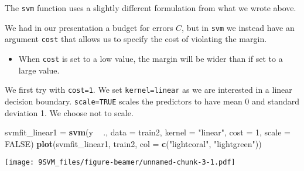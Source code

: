 \documentclass[10pt,ignorenonframetext,]{beamer}
\newenvironment{Shaded}{\begin{snugshade}}{\end{snugshade}}
\newcommand{\KeywordTok}[1]{\textcolor[rgb]{0.13,0.29,0.53}{\textbf{#1}}}
\newcommand{\DataTypeTok}[1]{\textcolor[rgb]{0.13,0.29,0.53}{#1}}
\newcommand{\DecValTok}[1]{\textcolor[rgb]{0.00,0.00,0.81}{#1}}
\newcommand{\StringTok}[1]{\textcolor[rgb]{0.31,0.60,0.02}{#1}}
\newcommand{\OtherTok}[1]{\textcolor[rgb]{0.56,0.35,0.01}{#1}}
\newcommand{\OperatorTok}[1]{\textcolor[rgb]{0.81,0.36,0.00}{\textbf{#1}}}
\newcommand{\NormalTok}[1]{#1}
\providecommand{\tightlist}{%
  \setlength{\itemsep}{0pt}\setlength{\parskip}{0pt}}
\begin{document}
\begin{frame}[fragile]

The \texttt{svm} function uses a slightly different formulation from
what we wrote above.

We had in our presentation a budget for errors \(C\), but in
\texttt{svm} we instead have an argument \texttt{cost} that allows us to
specify the cost of violating the margin.

\begin{itemize}
\tightlist
\item
  When \texttt{cost} is set to a low value, the margin will be wider
  than if set to a large value.
\end{itemize}

We first try with \texttt{cost=1}. We set
\texttt{kernel=\textquotesingle{}linear\textquotesingle{}} as we are
interested in a linear decision boundary. \texttt{scale=TRUE} scales the
predictors to have mean 0 and standard deviation 1. We choose not to
scale.

\end{frame}

\begin{frame}[fragile]

\footnotesize

\begin{Shaded}
\begin{Highlighting}[]
\NormalTok{svmfit_linear1 =}\StringTok{ }\KeywordTok{svm}\NormalTok{(y }\OperatorTok{~}\StringTok{ }\NormalTok{., }\DataTypeTok{data =}\NormalTok{ train2, }\DataTypeTok{kernel =} \StringTok{"linear"}\NormalTok{, }\DataTypeTok{cost =} \DecValTok{1}\NormalTok{, }
    \DataTypeTok{scale =} \OtherTok{FALSE}\NormalTok{)}
\KeywordTok{plot}\NormalTok{(svmfit_linear1, train2, }\DataTypeTok{col =} \KeywordTok{c}\NormalTok{(}\StringTok{"lightcoral"}\NormalTok{, }\StringTok{"lightgreen"}\NormalTok{))}
\end{Highlighting}
\end{Shaded}

\texttt{[image: 9SVM\_files/figure-beamer/unnamed-chunk-3-1.pdf]}

\end{frame}
\end{document}
